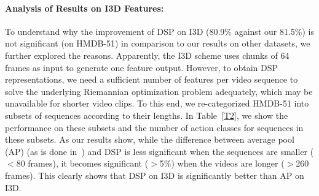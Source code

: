 \documentclass[runningheads]{llncs}
\newcommand{\para}[1]{\noindent\paragraph*{\textbf{#1}}}
\begin{document}
\begin{figure}
\begin{floatrow}
\end{floatrow}
\end{figure}

\para{Analysis of Results on I3D Features:} To understand why the improvement of DSP on I3D (80.9\% against our 81.5\%) is not significant (on HMDB-51) in comparison to our results on other datasets, we further explored the reasons. Apparently, the I3D scheme uses chunks of 64 frames as input to generate one feature output. However, to obtain DSP representations, we need a sufficient number of features per video sequence to solve the underlying Riemannian optimization problem adequately, which may be unavailable for shorter video clips. To this end, we re-categorized HMDB-51 into subsets of sequences according to their lengths. In Table~\ref{T2}, we show the performance on these subsets and the number of action classes for sequences in these subsets. As our results show, while the difference between average pool (AP) (as is done in~\cite{carreira2017quo}) and DSP is less significant when the sequences are smaller ($<$80 frames), it becomes significant ($>$5\%) when the videos are longer ($>$260 frames). This clearly shows that DSP on I3D is significantly better than AP on I3D. 
\end{document}
